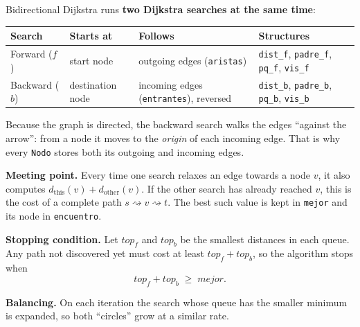 \documentclass[11pt,letterpaper]{article}
\newcommand{\code}[1]{\texttt{#1}}
\begin{document}
Bidirectional Dijkstra runs \textbf{two Dijkstra searches at the same time}:

\begin{center}
\begin{tabularx}{\textwidth}{lllL}
\toprule
\textbf{Search} & \textbf{Starts at} & \textbf{Follows} & \textbf{Structures} \\
\midrule
Forward ($f$)  & start node       & outgoing edges (\code{aristas})  & \code{dist\_f}, \code{padre\_f}, \code{pq\_f}, \code{vis\_f} \\
Backward ($b$) & destination node & incoming edges (\code{entrantes}), reversed & \code{dist\_b}, \code{padre\_b}, \code{pq\_b}, \code{vis\_b} \\
\bottomrule
\end{tabularx}
\end{center}

Because the graph is directed, the backward search walks the edges ``against
the arrow'': from a node it moves to the \emph{origin} of each incoming edge.
That is why every \code{Nodo} stores both its outgoing and incoming edges.

\textbf{Meeting point.} Every time one search relaxes an edge towards a node
$v$, it also computes $d_{\text{this}}(v) + d_{\text{other}}(v)$. If the
other search has already reached $v$, this is the cost of a complete path
$s \rightsquigarrow v \rightsquigarrow t$. The best such value is kept in
\code{mejor} and its node in \code{encuentro}.

\textbf{Stopping condition.} Let $top_f$ and $top_b$ be the smallest
distances in each queue. Any path not discovered yet must cost at least
$top_f + top_b$, so the algorithm stops when
\[
  top_f + top_b \;\ge\; mejor .
\]

\textbf{Balancing.} On each iteration the search whose queue has the smaller
minimum is expanded, so both ``circles'' grow at a similar rate.
\end{document}
